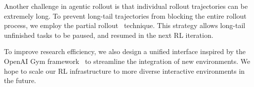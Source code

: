 Another challenge in agentic rollout is that individual rollout trajectories can be extremely long. To prevent long-tail trajectories from blocking the entire rollout process, we employ the partial rollout~\citep{team2025kimi} technique. This strategy allows long-tail unfinished tasks to be paused, and resumed in the next RL iteration.

To improve research efficiency, we also design a unified interface inspired by the OpenAI Gym framework~\citep{openaigym2016} to streamline the integration of new environments. We hope to scale our RL infrastructure to more diverse interactive environments in the future.